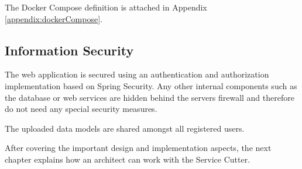 The Docker Compose definition is attached in Appendix \ref{appendix:dockerCompose}.


\subsection{Information Security}

The web application is secured using an authentication and authorization implementation based on Spring Security\cite{springSecurity}. Any other internal components such as the database or web services are hidden behind the servers firewall and therefore do not need any special security measures.

The uploaded data models are shared amongst all registered users.


\bigskip
After covering the important design and implementation aspects, the next chapter explains how an architect can work with the Service Cutter.
